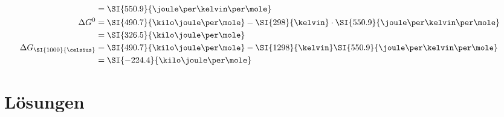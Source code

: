 \documentclass[ahaeffekt]{exercise}
\begin{document}
{\begin{alphlist}
\begin{align*}
\begin{split}
        \end{split} \\
        &= \SI{550.9}{\joule\per\kelvin\per\mole} \\
        \Delta G^0 &= \SI{490.7}{\kilo\joule\per\mole} - \SI{298}{\kelvin}\cdot\SI{550.9}{\joule\per\kelvin\per\mole} \\
        &= \SI{326.5}{\kilo\joule\per\mole} \\
        \Delta G_\text{\SI{1000}{\celsius}} &= \SI{490.7}{\kilo\joule\per\mole} - \SI{1298}{\kelvin}\SI{550.9}{\joule\per\kelvin\per\mole} \\
        &= \SI{-224.4}{\kilo\joule\per\mole}
       \end{align*}
\end{alphlist}
}

\newpage
\section*{Lösungen}
\dosolution
\newpage

\end{document}
